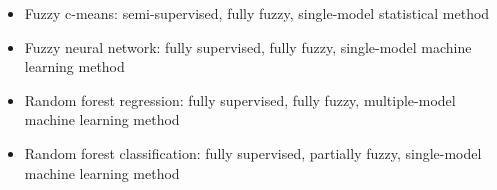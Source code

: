 \documentclass[a4paper,10pt]{article}
\begin{document}
\begin{itemize}
 \item Fuzzy c-means: semi-supervised, fully fuzzy, single-model statistical method
 \item Fuzzy neural network: fully supervised, fully fuzzy, single-model machine learning method
 \item Random forest regression: fully supervised, fully fuzzy, multiple-model machine learning method
 \item Random forest classification: fully supervised, partially fuzzy, single-model machine learning method
\end{itemize}



\end{document}
